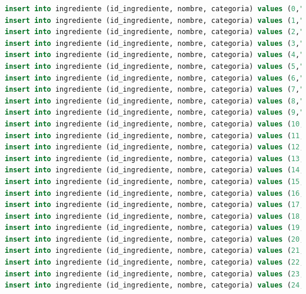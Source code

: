 \documentclass[12pt,letterpaper]{article}
\begin{document}
\begin{lstlisting}[language=sql]
insert into ingrediente (id_ingrediente, nombre, categoria) values (0,"Sal","Condimentos");
insert into ingrediente (id_ingrediente, nombre, categoria) values (1,"Macarrones","Pasta");
insert into ingrediente (id_ingrediente, nombre, categoria) values (2,"Azucar blanco","Edulcorantes");
insert into ingrediente (id_ingrediente, nombre, categoria) values (3,"Pimienta","Condimentos");
insert into ingrediente (id_ingrediente, nombre, categoria) values (4,"Leche liquida","Productos lacteos");
insert into ingrediente (id_ingrediente, nombre, categoria) values (5,"Nata","Productos lacteos");
insert into ingrediente (id_ingrediente, nombre, categoria) values (6,"Ajo","Frutas y hortalizas");
insert into ingrediente (id_ingrediente, nombre, categoria) values (7,"Cebolla","Frutas y hortalizas");
insert into ingrediente (id_ingrediente, nombre, categoria) values (8,"Pimiento","Frutas y hortalizas");
insert into ingrediente (id_ingrediente, nombre, categoria) values (9,"Tomate","Frutas y hortalizas");
insert into ingrediente (id_ingrediente, nombre, categoria) values (10,"Pollo","Productos carnicos");
insert into ingrediente (id_ingrediente, nombre, categoria) values (11,"Ternera","Productos carnicos");
insert into ingrediente (id_ingrediente, nombre, categoria) values (12,"Cerdo","Productos carnicos");
insert into ingrediente (id_ingrediente, nombre, categoria) values (13,"Pavo","Productos carnicos");
insert into ingrediente (id_ingrediente, nombre, categoria) values (14,"Dorada","Productos pesqueros");
insert into ingrediente (id_ingrediente, nombre, categoria) values (15,"Pulpo","Productos pesqueros");
insert into ingrediente (id_ingrediente, nombre, categoria) values (16,"Tortas","Productos de panaderia");
insert into ingrediente (id_ingrediente, nombre, categoria) values (17,"Pan leudado","Productos de panaderia");
insert into ingrediente (id_ingrediente, nombre, categoria) values (18,"Pan integral","Productos de panaderia");
insert into ingrediente (id_ingrediente, nombre, categoria) values (19,"Mantequilla","Grasas y aceites");
insert into ingrediente (id_ingrediente, nombre, categoria) values (20,"Aceite de oliva","Grasas y aceites");
insert into ingrediente (id_ingrediente, nombre, categoria) values (21,"Aceite de girasol","Grasas y aceites");
insert into ingrediente (id_ingrediente, nombre, categoria) values (22,"Miel","Edulcorantes");
insert into ingrediente (id_ingrediente, nombre, categoria) values (23,"Lactosa","Edulcorantes");
insert into ingrediente (id_ingrediente, nombre, categoria) values (24,"Azucar moreno","Edulcorantes");

\end{lstlisting}
\end{document}
